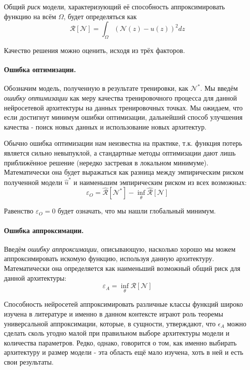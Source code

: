 \documentclass[a4paper, 12pt]{article}
\begin{document}
Общий \textit{риск} модели, характеризующий её способность аппроксимировать функцию на всём $\Omega$, будет определяться как
$$
\mathcal{R}[\mathcal{N}] = \int_{\Omega}(\mathcal{N}(z) - u(z))^2dz
$$

Качество решения можно оценить, исходя из трёх факторов.

\paragraph{Ошибка оптимизации.} Обозначим модель, полученную в результате тренировки, как $\mathcal{N}^*$. Мы введём \textit{ошибку оптимизации} как меру качества тренировочного процесса для данной нейросетевой архитектуры на данных тренировочных точках. Мы ожидаем, что если достигнут минимум ошибки оптимизации, дальнейший способ улучшения качества - поиск новых данных и использование новых архитектур. 

Обычно ошибка оптимизации нам неизвестна на практике, т.к. функция потерь является сильно невыпуклой, а стандартные методы оптимизации дают лишь приближённое решение (нередко застревая в локальном минимуме). Математически она будет выражаться как разница между эмпирическим риском полученной модели $\hat{u}^*$ и наименьшим эмпирическим риском из всех возможных:
$$
\varepsilon_O = \mathcal{\hat{R}}[\mathcal{N}^*] - \inf_{\theta}\mathcal{\hat{R}}[\mathcal{N}]
$$

Равенство $\varepsilon_O = 0$ будет означать, что мы нашли глобальный минимум.

\paragraph{Ошибка аппроксимации.} Введём \textit{ошибку аппроксимации}, описывающую, насколько хорошо мы можем аппроксимировать искомую функцию, используя данную архитектуру. Математически она определяется как наименьший возможный общий риск для данной архитектуры:
$$
\varepsilon_A = \inf_{\theta}\mathcal{R}[\mathcal{N}]
$$

Способность нейросетей аппроксимировать различные классы функций широко изучена в литературе и именно в данном контексте играют роль теоремы универсальной аппроксимации, которые, в сущности, утверждают, что $\epsilon_A$ можно сделать сколь угодно малой при правильном выборе архитектуры модели и количества параметров. Редко, однако, говорится о том, как именно выбирать архитектуру и размер модели - эта область ещё мало изучена, хоть в ней и есть свои результаты.
\end{document}
